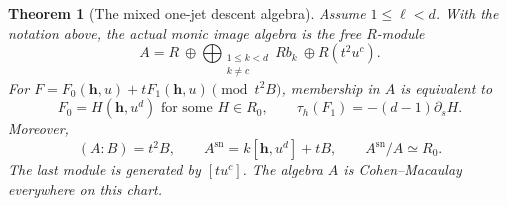 \documentclass[10pt,fleqn]{article}
\numberwithin{equation}{section}
\newtheorem{theorem}{Theorem}[section]
\begin{document}
\begin{theorem}[The mixed one-jet descent algebra]
\label{v7:mixed:affine}
Assume $1\le\ell<d$.  With the notation above, the actual monic
image algebra is the free $R$-module
\begin{equation}\label{v7:mixed:free-basis}
 A=R\ \oplus\!
 \bigoplus_{\substack{1\le k<d\\k\ne c}}Rb_k
 \ \oplus R(t^2u^c).
\end{equation}
For $F=F_0(\mathbf h,u)+tF_1(\mathbf h,u)\pmod{t^2B}$, membership in $A$
is equivalent to
\begin{equation}\label{v7:mixed:jet}
 F_0=H(\mathbf h,u^d)\text{ for some }H\in R_0,
 \qquad \tau_h(F_1)=-(d-1)\partial_s H.
\end{equation}
Moreover,
\begin{equation}\label{v7:mixed:affine-conductor}
 (A:B)=t^2B,\qquad
 A^{\mathrm{sn}}=k[\mathbf h,u^d]+tB,\qquad
 A^{\mathrm{sn}}/A\simeq R_0.
\end{equation}
The last module is generated by $[tu^c]$.  The algebra $A$ is
Cohen--Macaulay everywhere on this chart.
\end{theorem}
\end{document}
